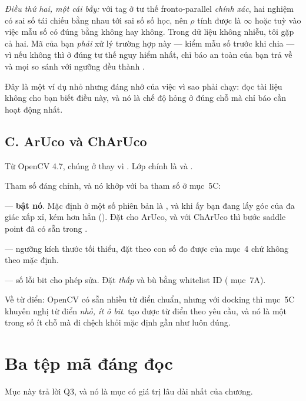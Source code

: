 \documentclass[../../marker.tex]{subfiles}
\begin{document}
\emph{Điều thứ hai, một cái bẫy:} với tag ở tư thế fronto-parallel \emph{chính xác}, hai nghiệm có sai số tái chiếu bằng nhau tới sai số số học, nên \(\rho\) tính được là \(\infty\) hoặc  tuỳ vào việc mẫu số có đúng bằng không hay không. Trong dữ liệu không nhiễu, tôi gặp cả hai. Mã của bạn \emph{phải} xử lý trường hợp này --- kiểm mẫu số trước khi chia --- vì nếu không thì ở đúng tư thế nguy hiểm nhất, chỉ báo an toàn của bạn trả về  và mọi so sánh với ngưỡng đều thành .

Đây là một ví dụ nhỏ nhưng đáng nhớ của việc vì sao phải chạy: đọc tài liệu không cho bạn biết điều này, và nó là chế độ hỏng ở đúng chỗ mà chỉ báo cần hoạt động nhất.

\subsection{C. ArUco và ChArUco}

Từ OpenCV 4.7, chúng ở  thay vì . Lớp chính là  và .

Tham số đáng chỉnh, và nó khớp với ba tham số ở  mục~5C:

\emph{} --- \textbf{bật nó}. Mặc định ở một số phiên bản là , và khi ấy bạn đang lấy góc của đa giác xấp xỉ, kém hơn hẳn (). Đặt  cho ArUco, và với ChArUco thì bước saddle point đã có sẵn trong .

\emph{} --- ngưỡng kích thước tối thiểu, đặt theo con số đo được của  mục~4 chứ không theo mặc định.

\emph{} --- số lỗi bit cho phép sửa. Đặt \emph{thấp} và bù bằng whitelist ID ( mục~7A).

Về từ điển: OpenCV có sẵn nhiều từ điển chuẩn, nhưng với docking thì  mục~5C khuyến nghị từ điển \emph{nhỏ, ít ô bit}.  tạo được từ điển theo yêu cầu, và nó là một trong số ít chỗ mà đi chệch khỏi mặc định gần như luôn đúng.

\section{Ba tệp mã đáng đọc}

Mục này trả lời Q3, và nó là mục có giá trị lâu dài nhất của chương.
\end{document}
